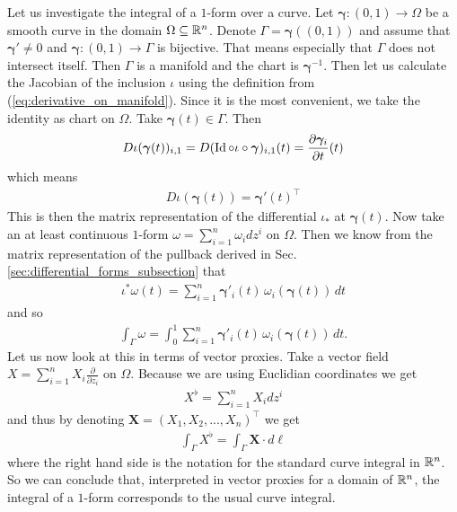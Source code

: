 \documentclass[../master_thesis.tex]{subfiles}
\begin{document}
\begin{example}\label{ex:integration_1_forms}
    Let us investigate the integral of a $1$-form over a curve. 
    Let $\bm{\gamma}: (0,1) \rightarrow \Omega$ be a smooth curve in the domain $\Omega 
    \subseteq \mathbb{R}^n$. Denote $\Gamma = \bm{\gamma}((0,1))$ and assume that 
    $\bm{\gamma}' \neq 0$ and $\bm{\gamma}: (0,1) \rightarrow \Gamma$ is bijective.
    That means especially that $\Gamma$ does not intersect itself.
    Then $\Gamma$ is a manifold and the chart is $\bm{\gamma}^{-1}$.
    Then let us calculate the Jacobian of the inclusion $\iota$ using the 
    definition from (\ref{eq:derivative_on_manifold}). 
    Since it is the most convenient, we take the 
    identity as chart on $\Omega$. Take $\bm{\gamma}(t) \in \Gamma$. Then
    \begin{align*}
        D\iota(\bm{\gamma}(t))_{i,1} = D(\operatorname{Id} \circ \iota \circ \bm{\gamma})_{i,1}(t)
        = \frac{\partial \bm{\gamma}_i}{\partial t}(t)
    \end{align*} 
    which means
    \begin{align*}
        D\iota(\bm{\gamma}(t)) = \bm{\gamma}'(t)^\top
    \end{align*}
    This is then the matrix representation of the differential $\iota_*$ at 
    $\bm{\gamma}(t)$.
    Now take an at least continuous $1$-form $\omega = \sum_{i=1}^n \omega_i dz^i$ 
    on $\Omega$. Then we know from the matrix representation of the 
    pullback derived in Sec.\,\ref{sec:differential_forms_subsection} that 
    \begin{align*}
        \iota^*\omega (t) = \sum_{i=1}^n \bm{\gamma}'_i(t) \, \omega_i(\bm{\gamma}(t)) \,dt
    \end{align*}
    and so
    \begin{align*}
        \int_\Gamma \omega = \int_0^1\sum_{i=1}^n \bm{\gamma}'_i(t) \, \omega_i(\bm{\gamma}(t)) \,dt.
    \end{align*}
    Let us now look at this in terms of vector proxies. Take a vector field 
    $X = \sum_{i=1}^n X_i \frac{\partial}{\partial z_i}$ on $\Omega$.
    Because we are using Euclidian coordinates we get
    \begin{align*}
        X^\flat = \sum_{i=1}^n X_i dz^i
    \end{align*}
    and thus by denoting $\mathbf{X} = (X_1, X_2, ..., X_n)^\top$ we get
    \begin{align*}
        \int_\Gamma X^\flat = \int_\Gamma \mathbf{X}\cdot d\ell
    \end{align*}
    where the right hand side is the notation for the standard curve integral 
    in $\mathbb{R}^n$. So we can conclude that, interpreted in vector proxies for 
    a domain of $\mathbb{R}^n$, the integral of a $1$-form corresponds to the usual 
    curve integral.
\end{example}
\end{document}
